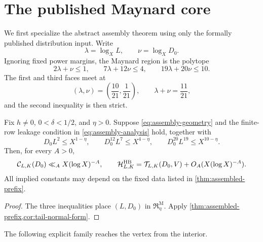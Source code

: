 \section{The published Maynard core}
\label{sec:published-core}

We first specialize the abstract assembly theorem using only the
formally published distribution input.  Write
\begin{equation}
 \lambda=\log_XL,
 \qquad \nu=\log_XD_0.
 \label{eq:maynard-exponent-coordinates}
\end{equation}
Ignoring fixed power margins, the Maynard region is the polytope
\begin{equation}
 2\lambda+\nu\le1,
 \qquad
 7\lambda+12\nu\le4,
 \qquad
 19\lambda+20\nu\le10.
 \label{eq:maynard-exponent-polytope}
\end{equation}
The first and third faces meet at
\begin{equation}
 (\lambda,\nu)=\left(\frac{10}{21},\frac1{21}\right),
 \qquad \lambda+\nu=\frac{11}{21},
 \label{eq:maynard-assembly-vertex}
\end{equation}
and the second inequality is then strict.

\begin{theorem}
\label{thm:published-assembled-wedge}
Fix $h\ne0$, $0<\delta<1/2$, and $\eta>0$.  Suppose
\eqref{eq:assembly-geometry} and the finite-row leakage condition in
\eqref{eq:assembly-analysis} hold, together with
\begin{equation}
 D_0L^2\le X^{1-\eta},
 \qquad
 D_0^{12}L^7\le X^{4-\eta},
 \qquad
 D_0^{20}L^{19}\le X^{10-\eta}.
 \label{eq:published-assembly-conditions}
\end{equation}
Then, for every $A>0$,
\begin{equation}
 \mathcal C_{L,K}(D_0)\ll_A X(\log X)^{-A},
 \qquad
 \mathcal H^{\mathrm{HB}}_{L,K}
 =\mathcal T_{L,K}(D_0,V)+O_A(X(\log X)^{-A}).
 \label{eq:published-assembled-conclusion}
\end{equation}
All implied constants may depend on the fixed data listed in
\cref{thm:assembled-prefix}.
\end{theorem}

\begin{proof}
The three inequalities place $(L,D_0)$ in
$\mathfrak R^{\mathrm M}_\eta$.  Apply
\cref{thm:assembled-prefix,cor:tail-normal-form}.
\end{proof}

The following explicit family reaches the vertex from the interior.

